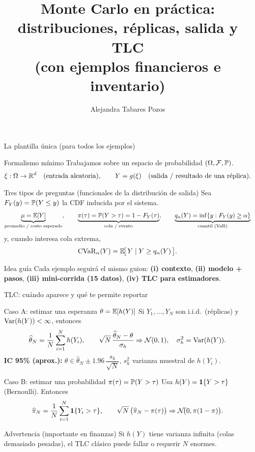 \documentclass[aspectratio=1610, 9pt]{beamer}
\title[Monte Carlo en práctica: distribuci…]{Monte Carlo en práctica: distribuciones, réplicas, salida y TLC\\(con ejemplos financieros e inventario)}
\subtitle{}
\author{Alejandra Tabares Pozos}
\institute{Universidad de los Andes \\
 Departamento de Ingeniería Industrial}
\date{}
\begin{document}
\begin{frame}
  \titlepage
\end{frame}

\begin{frame}{La plantilla única (para todos los ejemplos)}
\small
\begin{block}{Formalismo mínimo}
Trabajamos sobre un espacio de probabilidad $(\Omega,\mathcal{F},\mathbb{P})$.
\[
\xi:\Omega\to\mathbb{R}^d \quad\text{(entrada aleatoria)},\qquad
Y=g(\xi)\quad\text{(salida / resultado de una réplica)}.
\]
\end{block}

\begin{block}{Tres tipos de preguntas (funcionales de la distribución de salida)}
Sea $F_Y(y)=\mathbb{P}(Y\le y)$ la CDF inducida por el sistema.
\[
\underbrace{\mu=\mathbb{E}[Y]}_{\text{promedio / costo esperado}},\qquad
\underbrace{\pi(\tau)=\mathbb{P}(Y>\tau)=1-F_Y(\tau)}_{\text{cola / evento}},\qquad
\underbrace{q_\alpha(Y)=\inf\{y:F_Y(y)\ge \alpha\}}_{\text{cuantil (VaR)}}
\]
y, cuando interesa cola extrema,
\[
\mathrm{CVaR}_\alpha(Y)=\mathbb{E}\!\big[\,Y\mid Y\ge q_\alpha(Y)\,\big].
\]
\end{block}

\begin{alertblock}{Idea guía}
Cada ejemplo seguirá el mismo guion: \textbf{(i) contexto}, \textbf{(ii) modelo + pasos}, \textbf{(iii) mini-corrida (15 datos)}, \textbf{(iv) TLC para estimadores}.
\end{alertblock}
\end{frame}

\begin{frame}{TLC: cuándo aparece y qué te permite reportar}
\small
\begin{block}{Caso A: estimar una esperanza $\theta=\mathbb{E}[h(Y)]$}
Si $Y_1,\dots,Y_N$ son i.i.d.\ (réplicas) y $\operatorname{Var}(h(Y))<\infty$, entonces
\[
\widehat{\theta}_N=\frac{1}{N}\sum_{i=1}^N h(Y_i),
\qquad
\sqrt{N}\,\frac{\widehat{\theta}_N-\theta}{\sigma_h}\Rightarrow\mathcal{N}(0,1),
\quad \sigma_h^2=\operatorname{Var}(h(Y)).
\]
\textbf{IC 95\% (aprox.):}\quad
$\theta\in \widehat{\theta}_N \pm 1.96\,\dfrac{s_h}{\sqrt{N}}$,\;
$s_h^2$ varianza muestral de $h(Y_i)$.
\end{block}

\begin{block}{Caso B: estimar una probabilidad $\pi(\tau)=\mathbb{P}(Y>\tau)$}
Usa $h(Y)=\mathbf{1}\{Y>\tau\}$ (Bernoulli). Entonces
\[
\widehat{\pi}_N=\frac{1}{N}\sum_{i=1}^N \mathbf{1}\{Y_i>\tau\},
\qquad
\sqrt{N}\,\big(\widehat{\pi}_N-\pi(\tau)\big)\Rightarrow \mathcal{N}\!\big(0,\pi(1-\pi)\big).
\]
\end{block}

\begin{alertblock}{Advertencia (importante en finanzas)}
Si $h(Y)$ tiene varianza infinita (colas demasiado pesadas), el TLC clásico puede fallar o requerir $N$ enormes.
\end{alertblock}
\end{frame}
\end{document}
